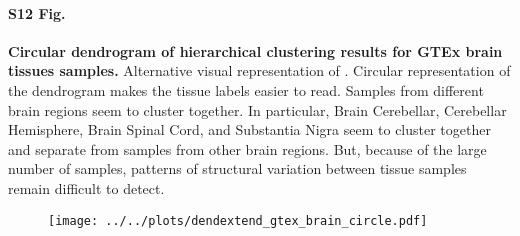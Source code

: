 \documentclass[10pt,letterpaper]{article}
\begin{document}
\paragraph*{S12 Fig.}

\label{figS12}
{\bf Circular dendrogram of hierarchical clustering results for GTEx brain tissues samples.} Alternative visual representation of . Circular representation of the dendrogram makes the tissue labels easier to read. Samples from different brain regions seem to cluster together. In particular, Brain Cerebellar, Cerebellar Hemisphere, Brain Spinal Cord, and Substantia Nigra seem to cluster together and separate from samples from other brain regions. But, because of the large number of samples, patterns of structural variation between tissue samples remain difficult to detect.
\begin{figure}[ht]
\centering
\texttt{[image: ../../plots/dendextend\_gtex\_brain\_circle.pdf]}
\end{figure}
\end{document}
